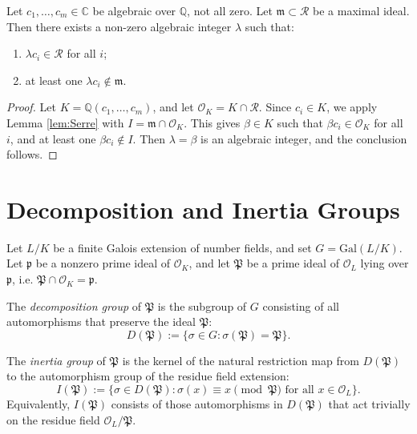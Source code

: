 \begin{cor}
Let \(c_1, \dots, c_m \in \mathbb{C}\) be algebraic over \(\mathbb{Q}\), not all zero. Let \(\mathfrak{m} \subset \mathcal{R}\) be a maximal ideal. Then there exists a non-zero algebraic integer \(\lambda\) such that:
\begin{enumerate}
    \item \(\lambda c_i \in \mathcal{R}\) for all \(i\);
    \item at least one \(\lambda c_i \notin \mathfrak{m}\).
\end{enumerate}
\end{cor}

\begin{proof}
Let \(K = \mathbb{Q}(c_1, \dots, c_m)\), and let \(\mathcal{O}_K = K \cap \mathcal{R}\). Since \(c_i \in K\), we apply Lemma \ref{lem:Serre} with \(I = \mathfrak{m} \cap \mathcal{O}_K\). This gives \(\beta \in K\) such that \(\beta c_i \in \mathcal{O}_K\) for all \(i\), and at least one \(\beta c_i \notin I\). Then \(\lambda = \beta\) is an algebraic integer, and the conclusion follows.
\end{proof}


\section{Decomposition and Inertia Groups}

Let \(L/K\) be a finite Galois extension of number fields, and set \(G = \mathrm{Gal}(L/K)\). Let \(\mathfrak{p}\) be a nonzero prime ideal of \(\mathcal{O}_K\), and let \(\mathfrak{P}\) be a prime ideal of \(\mathcal{O}_L\) lying over \(\mathfrak{p}\), i.e. \(\mathfrak{P} \cap \mathcal{O}_K = \mathfrak{p}\).

\begin{defn}
The \emph{decomposition group} of \(\mathfrak{P}\) is the subgroup of \(G\) consisting of all automorphisms that preserve the ideal \(\mathfrak{P}\):
\[
D(\mathfrak{P}) := \{ \sigma \in G : \sigma(\mathfrak{P}) = \mathfrak{P} \}.
\]
\end{defn}

\begin{defn}
The \emph{inertia group} of \(\mathfrak{P}\) is the kernel of the natural restriction map from \(D(\mathfrak{P})\) to the automorphism group of the residue field extension:
\[
I(\mathfrak{P}) := \{ \sigma \in D(\mathfrak{P}) : \sigma(x) \equiv x \pmod{\mathfrak{P}} \text{ for all } x \in \mathcal{O}_L \}.
\]
Equivalently, \(I(\mathfrak{P})\) consists of those automorphisms in \(D(\mathfrak{P})\) that act trivially on the residue field \(\mathcal{O}_L/\mathfrak{P}\).
\end{defn}

